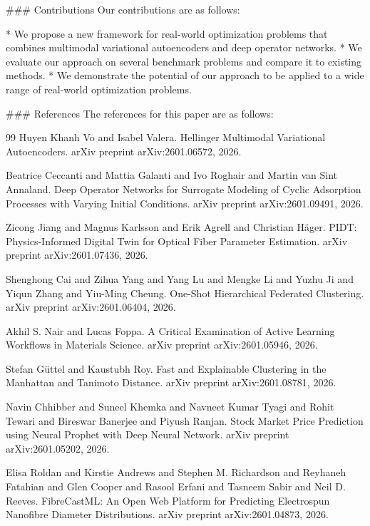 \documentclass{article}
\begin{document}
### Contributions
Our contributions are as follows:

* We propose a new framework for real-world optimization problems that combines multimodal variational autoencoders and deep operator networks.
* We evaluate our approach on several benchmark problems and compare it to existing methods.
* We demonstrate the potential of our approach to be applied to a wide range of real-world optimization problems.

### References
The references for this paper are as follows:

\begin{thebibliography}{99}
Huyen Khanh Vo and Isabel Valera. Hellinger Multimodal Variational Autoencoders. arXiv preprint arXiv:2601.06572, 2026.

Beatrice Ceccanti and Mattia Galanti and Ivo Roghair and Martin van Sint Annaland. Deep Operator Networks for Surrogate Modeling of Cyclic Adsorption Processes with Varying Initial Conditions. arXiv preprint arXiv:2601.09491, 2026.

Zicong Jiang and Magnus Karlsson and Erik Agrell and Christian Häger. PIDT: Physics-Informed Digital Twin for Optical Fiber Parameter Estimation. arXiv preprint arXiv:2601.07436, 2026.

Shenghong Cai and Zihua Yang and Yang Lu and Mengke Li and Yuzhu Ji and Yiqun Zhang and Yiu-Ming Cheung. One-Shot Hierarchical Federated Clustering. arXiv preprint arXiv:2601.06404, 2026.

Akhil S. Nair and Lucas Foppa. A Critical Examination of Active Learning Workflows in Materials Science. arXiv preprint arXiv:2601.05946, 2026.

Stefan Güttel and Kaustubh Roy. Fast and Explainable Clustering in the Manhattan and Tanimoto Distance. arXiv preprint arXiv:2601.08781, 2026.

Navin Chhibber and Suneel Khemka and Navneet Kumar Tyagi and Rohit Tewari and Bireswar Banerjee and Piyush Ranjan. Stock Market Price Prediction using Neural Prophet with Deep Neural Network. arXiv preprint arXiv:2601.05202, 2026.

Elisa Roldan and Kirstie Andrews and Stephen M. Richardson and Reyhaneh Fatahian and Glen Cooper and Rasool Erfani and Tasneem Sabir and Neil D. Reeves. FibreCastML: An Open Web Platform for Predicting Electrospun Nanofibre Diameter Distributions. arXiv preprint arXiv:2601.04873, 2026.


\end{thebibliography}
\end{document}

